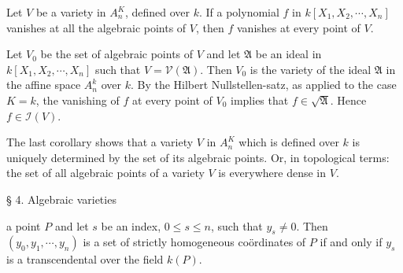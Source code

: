 Let $V$ be a variety in $A_n^K$, defined over $k$. If a polynomial $f$ in $k[X_1, X_2, \cdots, X_n]$ vanishes at all the algebraic points of $V$, then $f$ vanishes at every point of $V$.

Let $V_0$ be the set of algebraic points of $V$ and let $\mathfrak{A}$ be an ideal in $k[X_1, X_2, \cdots, X_n]$ such that $V = \mathcal{V}(\mathfrak{A})$. Then $V_0$ is the variety of the ideal $\mathfrak{A}$ in the affine space $A_n^k$ over $k$. By the Hilbert Nullstellen-satz, as applied to the case $K = k$, the vanishing of $f$ at every point of $V_0$ implies that $f \in \sqrt{\mathfrak{A}}$. Hence $f \in \mathcal{I}(V)$.

The last corollary shows that a variety $V$ in $A_n^K$ which is defined over $k$ is uniquely determined by the set of its algebraic points. Or, in topological terms: the set of all algebraic points of a variety $V$ is everywhere dense in $V$.

§ 4. Algebraic varieties

a point $P$ and let $s$ be an index, $0 \leq s \leq n$, such that $y_s \neq 0$. Then $(y_0, y_1, \cdots, y_n)$ is a set of strictly homogeneous coördinates of $P$ if and only if $y_s$ is a transcendental over the field $k(P)$.